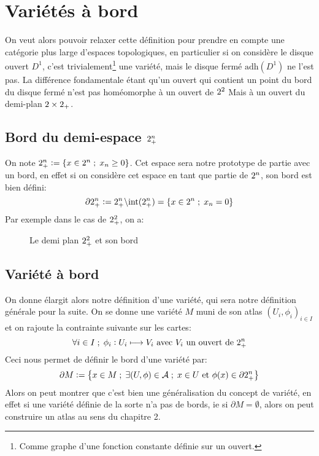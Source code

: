 \chapter{Variétés à bord}
   On veut alors pouvoir relaxer cette définition pour prendre en compte une catégorie plus large d'espaces topologiques, en particulier si on considère le disque ouvert \( D^1 \), c'est trivialement\footnote[1]{Comme graphe d'une fonction constante définie sur un ouvert.} une variété, mais le disque fermé \( \text{adh}(D^1) \) ne l'est pas. La différence fondamentale étant qu'un ouvert qui contient un point du bord du disque fermé n'est pas homéomorphe à un ouvert de \( 2^2 \) Mais à un ouvert du demi-plan \( 2 \times 2_+ \).

   \section{Bord du demi-espace \( 2^n_+ \)}
   On note \( 2^n_+ := \left\{ x \in 2^n  \; ; \; x_n \geq 0\right\} \). Cet espace sera notre prototype de partie avec un bord, en effet si on considère cet espace en tant que partie de \( 2^n \), son bord est bien défini:
   \[ 
      \partial 2^n_+ := 2^n_+ \backslash \text{int}(2^n_+) = \left\{ x \in 2^n \; ; \; x_n = 0\right\}  
   \]
   Par exemple dans le cas de \( 2^2_+ \), on a:
      \begin{figure}[ht!]
         \centering
        \caption{Le demi plan \( 2^2_+ \) et son bord}
      \end{figure}
   \vspace{-15pt}
   \section{Variété à bord}
   On donne élargit alors notre définition d'une variété, qui sera notre définition générale pour la suite. On se donne une variété \( M \) muni de son atlas \( (U_i, \phi_i)_{i \in I} \) et on rajoute la contrainte suivante sur les cartes:
   \[ 
      \forall i \in I \; ; \; \phi_i : U_i \longmapsto V_i \text{ avec } V_i \text{ un ouvert de } 2^n_+
   \]
   Ceci nous permet de définir le bord d'une variété par:
   \[ 
      \partial M := \left\{ x \in M  \; ; \; \exists (U, \phi) \in \mathcal{A} \; ; \; x \in U \text{ et } \phi(x) \in \partial2^n_+\right\}  
   \]
   Alors on peut montrer que c'est bien une généralisation du concept de variété, en effet si une variété définie de la sorte n'a pas de bords, ie si \( \partial M = \emptyset\), alors on peut construire un atlas au sens du chapitre 2.\<

